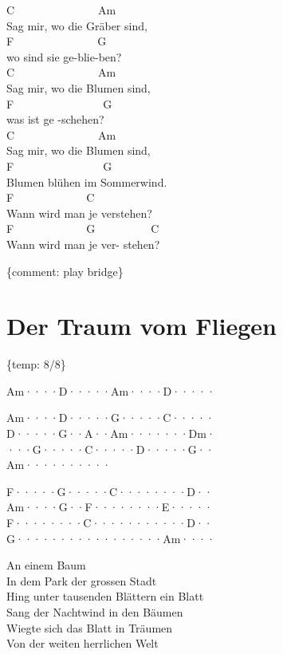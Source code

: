 \documentclass[
  letterpaper,
]{scrbook}
\begin{document}
C~~~~~~~~~~~~~~~Am~~~~~~~~~~~\\
Sag mir, wo die Gräber sind,\\
F~~~~~~~~~~~~~~~G\\
wo sind sie ge-blie-ben?\\
C~~~~~~~~~~~~~~~Am~~~~~~~~~~~\\
Sag mir, wo die Blumen sind,\\
F~~~~~~~~~~~~~~~~G\\
was ist ge -schehen?\\
C~~~~~~~~~~~~~~~Am~~~~~~~~~~~\\
Sag mir, wo die Blumen sind,\\
F~~~~~~~~~~~~~~~~G\\
Blumen blühen im Sommerwind.\\
F~~~~~~~~~~~~~C~~~~~~~~~~~~~~~~~\\
Wann wird man je verstehen?~~~~~\\
F~~~~~~~~~~~~~G~~~~~~~~~~C\\
Wann wird man je ver- stehen?

\{comment: play bridge\}

\hypertarget{der-traum-vom-fliegen}{%
\chapter{Der Traum vom Fliegen}\label{der-traum-vom-fliegen}}

\{temp: 8/8\}

Am····\textbar D·····\textbar Am····\textbar D·····\textbar{}

Am····\textbar D·····\textbar G·····\textbar C·····\textbar{}\\
D·····\textbar G··A··\textbar Am····\textbar···Dm·\textbar{}\\
···G··\textbar···C··\textbar···D··\textbar···G··\textbar{}\\
Am····\textbar······\textbar{}

F·····\textbar G·····\textbar C·····\textbar···D··\textbar{}\\
Am····\textbar G··F··\textbar······\textbar E·····\textbar{}\\
F·····\textbar···C··\textbar······\textbar···D··\textbar{}\\
G·····\textbar······\textbar······\textbar Am····\textbar{}

An einem Baum\\
In dem Park der grossen Stadt\\
Hing unter tausenden Blättern ein Blatt\\
Sang der Nachtwind in den Bäumen\\
Wiegte sich das Blatt in Träumen\\
Von der weiten herrlichen Welt
\end{document}

